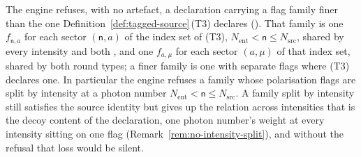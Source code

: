 
\begin{requirement}\label{req:shared-flags}
The engine refuses, with no artefact, a declaration carrying a flag family finer
than the one Definition~\ref{def:tagged-source}\,(T3) declares
(). That family is one
 $f_{\mathsf{n},a}$ for each sector $(\mathsf{n},a)$ of
the index set of (T3), $N_{\mathrm{ent}}<\mathsf{n}\le N_{\mathrm{src}}$, shared
by every intensity and both , and one
 $f_{a,\mu}$ for each sector $(a,\mu)$ of
that index set, shared by both round types; a finer family is one with separate
flags where (T3) declares one. In particular the engine refuses a family whose
polarisation flags are split by intensity at a photon number
$N_{\mathrm{ent}}<\mathsf{n}\le N_{\mathrm{src}}$. A family split by intensity
still satisfies the source identity but gives up the relation across
intensities that is the decoy content of the declaration, one photon number's
weight at every intensity sitting on one flag
(Remark~\ref{rem:no-intensity-split}), and without the refusal that loss would
be silent.
\end{requirement}
